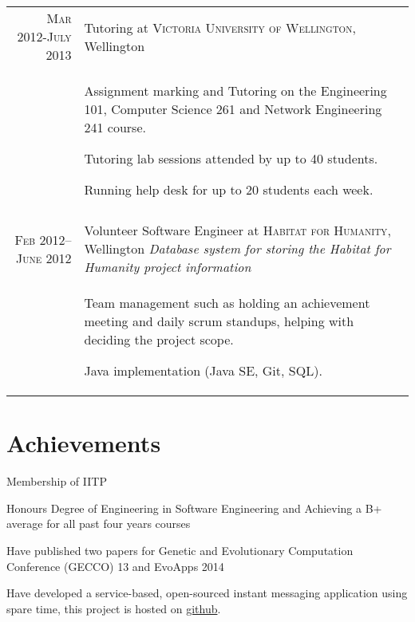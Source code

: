 \documentclass[a4paper,10pt]{article} %
\begin{document}
\begin{tabular}{r|p{11cm}}

\textsc{Mar 2012-July 2013} & Tutoring at \textsc{Victoria University of Wellington}, Wellington \emph{}\\
& \footnotesize{
Assignment marking and Tutoring on the Engineering 101, Computer Science 261 and Network Engineering 241 course.

Tutoring lab sessions attended by up to 40 students.

Running help desk for up to 20 students each week.
}\\
\multicolumn{2}{c}{} \\


\textsc{Feb 2012–June 2012} & Volunteer Software Engineer at \textsc{Habitat for Humanity}, Wellington
 \emph{Database system for storing the Habitat for Humanity project information}\\
& \footnotesize{

Team management such as holding an achievement meeting and daily scrum standups, helping with deciding the project scope.

Java implementation (Java SE, Git, SQL).

}

\end{tabular}





\section{Achievements}

Membership of IITP

Honours Degree of Engineering in Software Engineering and Achieving a B+ average for all past four years courses

Have published two papers for Genetic and Evolutionary Computation Conference (GECCO) 13 and EvoApps 2014

Have developed a service-based, open-sourced instant messaging application using spare time, this project is hosted on \href{https://github.com/alvindaiyan/goTalk}{github}.
\end{document}
